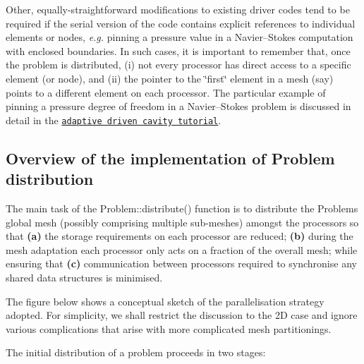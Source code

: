 \begin{DoxyItemize}
\item Other, equally-\/straightforward modifications to existing driver codes tend to be required if the serial version of the code contains explicit references to individual elements or nodes, {\itshape  e.\+g. } pinning a pressure value in a Navier--Stokes computation with enclosed boundaries. In such cases, it is important to remember that, once the problem is distributed, {\bfseries }(i) not every processor has direct access to a specific element (or node), and {\bfseries }(ii) the pointer to the \char`\"{}first\char`\"{} element in a mesh (say) points to a different element on each processor. The particular example of pinning a pressure degree of freedom in a Navier--Stokes problem is discussed in detail in the \href{../../adaptive_driven_cavity/html/index.html}{\tt adaptive driven cavity tutorial}.
\end{DoxyItemize}



\hypertarget{index_how_it_works}{}\subsection{Overview of the implementation of Problem distribution}\label{index_how_it_works}
The main task of the {\ttfamily Problem\+::distribute()} function is to distribute the {\ttfamily Problem\textquotesingle{}s} global mesh (possibly comprising multiple sub-\/meshes) amongst the processors so that {\bfseries (a)} the storage requirements on each processor are reduced; {\bfseries (b)} during the mesh adaptation each processor only acts on a fraction of the overall mesh; while ensuring that {\bfseries (c)} communication between processors required to synchronise any shared data structures is minimised.

The figure below shows a conceptual sketch of the parallelisation strategy adopted. For simplicity, we shall restrict the discussion to the 2D case and ignore various complications that arise with more complicated mesh partitionings.

The initial distribution of a problem proceeds in two stages\+:


